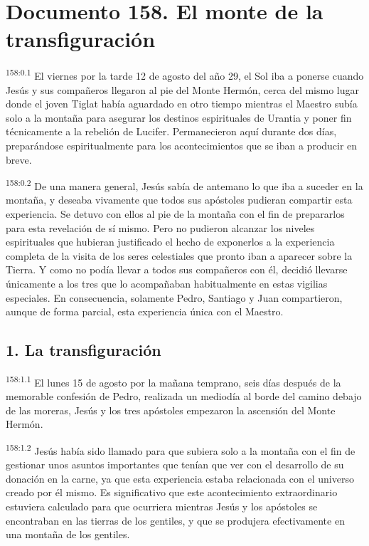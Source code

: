 \chapter{Documento 158. El monte de la transfiguración}
\par 
\textsuperscript{158:0.1} El viernes por la tarde 12 de agosto del año 29, el Sol iba a ponerse cuando Jesús y sus compañeros llegaron al pie del Monte Hermón, cerca del mismo lugar donde el joven Tiglat había aguardado en otro tiempo mientras el Maestro subía solo a la montaña para asegurar los destinos espirituales de Urantia y poner fin técnicamente a la rebelión de Lucifer. Permanecieron aquí durante dos días, preparándose espiritualmente para los acontecimientos que se iban a producir en breve.

\par 
\textsuperscript{158:0.2} De una manera general, Jesús sabía de antemano lo que iba a suceder en la montaña, y deseaba vivamente que todos sus apóstoles pudieran compartir esta experiencia. Se detuvo con ellos al pie de la montaña con el fin de prepararlos para esta revelación de sí mismo. Pero no pudieron alcanzar los niveles espirituales que hubieran justificado el hecho de exponerlos a la experiencia completa de la visita de los seres celestiales que pronto iban a aparecer sobre la Tierra. Y como no podía llevar a todos sus compañeros con él, decidió llevarse únicamente a los tres que lo acompañaban habitualmente en estas vigilias especiales. En consecuencia, solamente Pedro, Santiago y Juan compartieron, aunque de forma parcial, esta experiencia única con el Maestro.

\section*{1. La transfiguración}
\par 
\textsuperscript{158:1.1} El lunes 15 de agosto por la mañana temprano, seis días después de la memorable confesión de Pedro, realizada un mediodía al borde del camino debajo de las moreras, Jesús y los tres apóstoles empezaron la ascensión del Monte Hermón.

\par 
\textsuperscript{158:1.2} Jesús había sido llamado para que subiera solo a la montaña con el fin de gestionar unos asuntos importantes que tenían que ver con el desarrollo de su donación en la carne, ya que esta experiencia estaba relacionada con el universo creado por él mismo. Es significativo que este acontecimiento extraordinario estuviera calculado para que ocurriera mientras Jesús y los apóstoles se encontraban en las tierras de los gentiles, y que se produjera efectivamente en una montaña de los gentiles.

